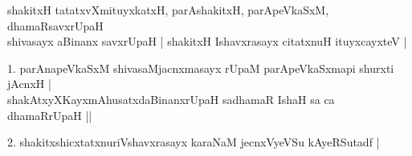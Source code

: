 \begin{entry}
\end{entry}

\begin{entry}
\gl{}
\info{}{}{}{}
\begin{shl}
shakitxH tatatxvXmituyxkatxH, parAshakitxH, parApeVkaSxM, dhamaRsavxrUpaH\\
shivasayx aBinanx savxrUpaH | shakitxH Ishavxrasayx citatxnuH ituyxcayxteV |
\end{shl}
\begin{shl}
1. parAnapeVkaSxM shivasaMjacnxmasayx rUpaM parApeVkaSxmapi shurxti jAcnxH |\\
shakAtxyXKayxmAhusatxdaBinanxrUpaH sadhamaR IshaH sa ca dhamaRrUpaH ||
\end{shl}
\begin{shl}
2. shakitxshicxtatxnuriVshavxrasayx karaNaM jecnxVyeVSu kAyeRSutadf |
\end{shl}
\end{entry}

